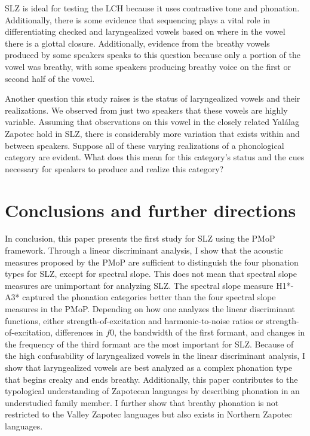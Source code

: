 \documentclass[12pt, letterpaper]{article}
\begin{document}
SLZ is ideal for testing the LCH because it uses contrastive tone and phonation. Additionally, there is some evidence that sequencing plays a vital role in differentiating checked and laryngealized vowels based on where in the vowel there is a glottal closure. Additionally, evidence from the breathy vowels produced by some speakers speaks to this question because only a portion of the vowel was breathy, with some speakers producing breathy voice on the first or second half of the vowel. 

Another question this study raises is the status of laryngealized vowels and their realizations. We observed from just two speakers that these vowels are highly variable. Assuming that  observations on this vowel in the closely related Yalálag Zapotec hold in SLZ, there is considerably more variation that exists within and between speakers. Suppose all of these varying realizations of a phonological category are evident. What does this mean for this category's status and the cues necessary for speakers to produce and realize this category? 

\section{Conclusions and further directions } \label{sec:Conclusion}

In conclusion, this paper presents the first study for SLZ using the PMoP framework. Through a linear discriminant analysis, I show that the acoustic measures proposed by the PMoP are sufficient to distinguish the four phonation types for SLZ, except for spectral slope. This does not mean that spectral slope measures are unimportant for analyzing
SLZ. The spectral slope measure H1*-A3* captured the phonation categories better than the four spectral slope measures in the PMoP. Depending on how one analyzes the linear discriminant functions, either strength-of-excitation and harmonic-to-noise ratios or strength-of-excitation, differences in $f0$, the bandwidth of the first formant, and changes in the frequency of the third formant are the most important for SLZ. Because of the high confusability of laryngealized vowels in the linear discriminant analysis, I show that laryngealized vowels are best analyzed as a complex phonation type that begins creaky and ends breathy. Additionally, this paper contributes to the typological understanding of Zapotecan languages by describing phonation in an understudied family member. I further show that breathy phonation is not restricted to the Valley Zapotec languages but also exists in Northern Zapotec languages. 
\end{document}
